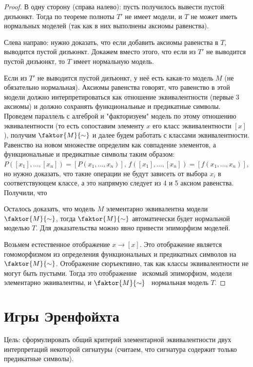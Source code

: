 \documentclass{article}
\begin{document}
\begin{proof}
	В одну сторону (справа налево): пусть получилось вывести пустой дизъюнкт. Тогда по теореме полноты $T'$ не имеет модели, и $T$ не может иметь нормальных моделей (так как в них выполнены аксиомы равенства).

	Слева направо: нужно доказать, что если добавить аксиомы равенства в $T$, выводится пустой дизъюнкт. Докажем вместо этого, что если из $T'$ не выводится пустой дизъюнкт, то $T$ имеет нормальную модель.

	Если из $T'$ не выводится пустой дизъюнкт, у неё есть какая-то модель $M$ (не обязательно нормальная). Аксиомы равенства говорят, что равенство в этой модели должно интерпретироваться как отношение эквивалентности (первые 3 аксиомы) и должно сохранять функциональные и предикатные символы. Проведем параллель с алгеброй и "факторизуем" модель по этому отношению эквивалентности (то есть сопоставим элементу $x$ его класс эквивалентности $[x]$), получим $\faktor{M}{\sim}$ и далее будем работать с классами эквивалентности. Равенство на новом множестве определим как совпадение элементов, а функциональные и предикатные символы таким образом: $P([x_1], \dots, [x_n]) = \left[P(x_1, \dots, x_n)\right]$, $f([x_1], \dots, [x_n]) = \left[f(x_1, \dots, x_n)\right]$, но нужно доказать, что такие операции не будут зависеть от выбора $x_i$ в соответствующем классе, а это напрямую следует из 4 и 5 аксиом равенства. Получили, что

	Осталось доказать, что модель $M$ элементарно эквивалентна модели $\faktor{M}{\sim}$, тогда $\faktor{M}{\sim}$ автоматически будет нормальной моделью $T$. Для доказательства можно явно привести эпиморфизм моделей.

	Возьмем естественное отображение $x \rightarrow [x]$. Это отображение является гомоморфизмом из определения функциональных и предикатных символов на $\faktor{M}{\sim}$. Отображение сюръективно, так как классы эквивалентности не могут быть пустыми. Тогда это отображение \textemdash\ искомый эпиморфизм, модели элементарно эквивалентны, и $\faktor{M}{\sim}$ \textemdash\ нормальная модель $T$.
\end{proof}

\setcounter{section}{25}
\section{Игры Эренфойхта}

Цель: сформулировать общий критерий
элементарной эквивалентности двух интерпретаций некоторой сигнатуры (считаем, что сигнатура содержит только предикатные символы).
\end{document}
